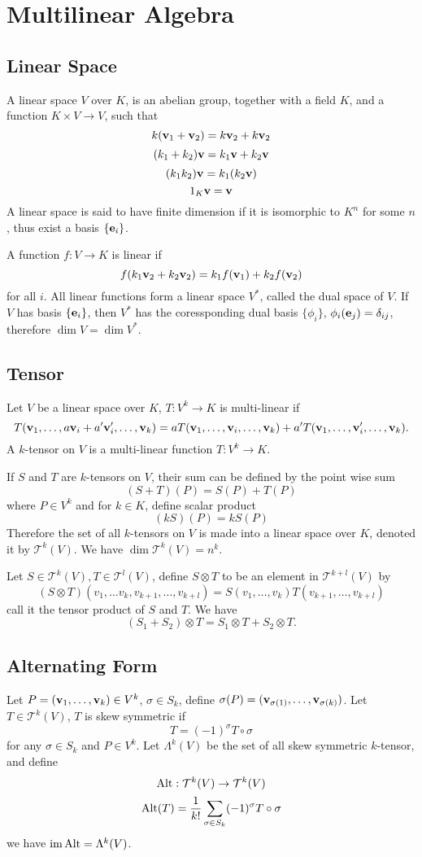 
\section{Multilinear Algebra}
\subsection{Linear Space}
A linear space $V$ over $K$, is an abelian group, together with a field $K$,
and a function $K \times V \to V$, such that
$$k({\bf v}_1 + {\bf v}_2) = k{\bf v}_2 + k{\bf v}_2$$
$$(k_1 + k_2){\bf v} = k_1{\bf v} + k_2{\bf v}$$
$$(k_1k_2){\bf v} = k_1(k_2 {\bf v})$$
$$1_K {\bf v} = {\bf v}$$
A linear space is said to have finite dimension if it is isomorphic to $K^n$
for some $n$, thus exist a basis $\{{\bf e}_i\}$.

A function $f : V \to K$ is linear if
$$f(k_1 {\bf v}_2 + k_2 {\bf v}_2) = k_1 f({\bf v}_1) + k_2 f({\bf v}_2)$$
for all $i$.
All linear functions form a linear space $V^\ast$, called the dual space of $V$.
If $V$ has basis $\{{\bf e}_i\}$,
then $V^\ast$ has the coressponding dual basis $\{\phi_i\}$,
$\phi_i({\bf e}_j) = \delta_{ij}$,
therefore $\dim V = \dim V^\ast$.

\subsection{Tensor}
Let $V$ be a linear space over $K$, $T : V^k \to K$ is multi-linear if
$$T({\bf v}_1, \dots , a {\bf v}_i + a^\prime {\bf v}_i^\prime, \dots, {\bf v}_k)
= a T({\bf v}_1, \dots, {\bf v}_i, \dots, {\bf v}_k)
+ a^\prime T({\bf v}_1, \dots, {\bf v}_i^\prime, \dots, {\bf v}_k).$$
A $k$-tensor on $V$ is a multi-linear function $T : V^k \to K$.

If $S$ and $T$ are $k$-tensors on $V$, their sum can be defined by the point wise sum
$$(S + T)(P) = S(P) + T(P)$$
where $P \in V^k$ and for $k \in K$, define scalar product
$$(k S)(P) = k S(P)$$
Therefore the set of all $k$-tensors on $V$ is made into a linear space
over $K$, denoted it by $\mathcal{T}^k(V)$.
We have $\dim \mathcal{T}^k(V) = n^k$.


Let $S \in \mathcal{T}^k(V), T \in \mathcal{T}^l(V)$,
define $S \otimes T$ to be an element in $\mathcal{T}^{k + l}(V)$ by
$$(S \otimes T)(v_1, \dots v_k, v_{k+1}, \dots, v_{k + l})
= S(v_1, \dots, v_k)T(v_{k+1}, \dots, v_{k+l})$$
call it the tensor product of $S$ and $T$.
We have $$(S_1 + S_2) \otimes T = S_1 \otimes T + S_2 \otimes T.$$

\subsection{Alternating Form}
Let $P = ({\bf v}_1, \dots, {\bf v}_k) \in V^k$, $\sigma \in S_k$,
define $\sigma(P) = ({\bf v}_{\sigma(1)}, \dots, {\bf v}_{\sigma(k)})$.
Let $T \in \mathcal{T}^k(V)$, $T$ is skew symmetric if
$$T = (-1)^\sigma T \circ \sigma$$
for any $\sigma \in S_k$ and $P \in V^k$.
Let $\Lambda^k(V)$ be the set of all skew symmetric $k$-tensor,
and define $$\mathop{\mathrm{Alt}} : \mathcal{T}^k(V) \to \mathcal{T}^k(V)$$
$$\mathop{\mathrm{Alt}}(T) = {1 \over k!} \sum_{\sigma \in S_k} (-1)^\sigma T \circ \sigma$$
we have $\mathop{\mathrm{im}} \mathop{\mathrm{Alt}} = \Lambda^k(V)$.

